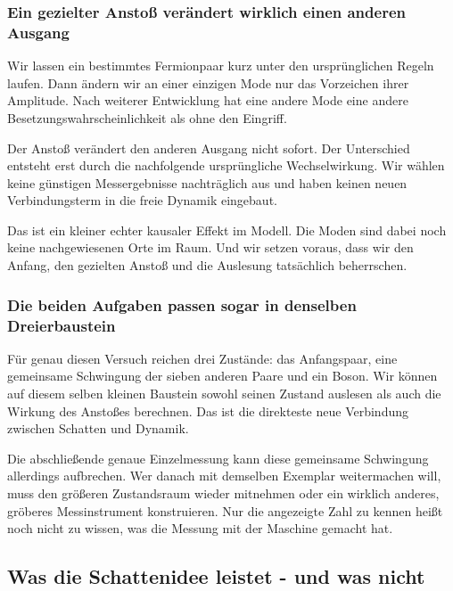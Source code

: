 \documentclass[
  ngerman,
  10pt,
  a4paper,
]{article}
\begin{document}
\subsubsection{Ein gezielter Anstoß verändert wirklich einen anderen
Ausgang}\label{ein-gezielter-anstouxdf-veruxe4ndert-wirklich-einen-anderen-ausgang}

Wir lassen ein bestimmtes Fermionpaar kurz unter den ursprünglichen
Regeln laufen. Dann ändern wir an einer einzigen Mode nur das Vorzeichen
ihrer Amplitude. Nach weiterer Entwicklung hat eine andere Mode eine
andere Besetzungswahrscheinlichkeit als ohne den Eingriff.

Der Anstoß verändert den anderen Ausgang nicht sofort. Der Unterschied
entsteht erst durch die nachfolgende ursprüngliche Wechselwirkung. Wir
wählen keine günstigen Messergebnisse nachträglich aus und haben keinen
neuen Verbindungsterm in die freie Dynamik eingebaut.

Das ist ein kleiner echter kausaler Effekt im Modell. Die Moden sind
dabei noch keine nachgewiesenen Orte im Raum. Und wir setzen voraus,
dass wir den Anfang, den gezielten Anstoß und die Auslesung tatsächlich
beherrschen.

\subsubsection{Die beiden Aufgaben passen sogar in denselben
Dreierbaustein}\label{die-beiden-aufgaben-passen-sogar-in-denselben-dreierbaustein}

Für genau diesen Versuch reichen drei Zustände: das Anfangspaar, eine
gemeinsame Schwingung der sieben anderen Paare und ein Boson. Wir können
auf diesem selben kleinen Baustein sowohl seinen Zustand auslesen als
auch die Wirkung des Anstoßes berechnen. Das ist die direkteste neue
Verbindung zwischen Schatten und Dynamik.

Die abschließende genaue Einzelmessung kann diese gemeinsame Schwingung
allerdings aufbrechen. Wer danach mit demselben Exemplar weitermachen
will, muss den größeren Zustandsraum wieder mitnehmen oder ein wirklich
anderes, gröberes Messinstrument konstruieren. Nur die angezeigte Zahl
zu kennen heißt noch nicht zu wissen, was die Messung mit der Maschine
gemacht hat.

\subsection{Was die Schattenidee leistet - und was
nicht}\label{was-die-schattenidee-leistet---und-was-nicht}
\end{document}
